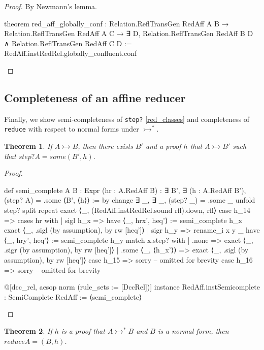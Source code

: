 \documentclass{article}
\newtheorem{theorem}{Theorem}
\newcommand{\affarr}{\rightarrowtail}
\begin{document}
\begin{proof}
  By Newmann's lemma.

\begin{leancode}
theorem red_aff_globally_conf : Relation.ReflTransGen RedAff A B
  → Relation.ReflTransGen RedAff A C
  → ∃ D, Relation.ReflTransGen RedAff B D
  ∧ Relation.ReflTransGen RedAff C D :=
  RedAff.instRedRel.globally_confluent.conf
\end{leancode}
\end{proof}

\subsection{Completeness of an affine reducer}

Finally, we show semi-completeness of \texttt{step?} \eqref{red_classes} and completeness of \texttt{reduce} with respect to normal forms under \(\affarr^{*}\).

\begin{theorem}
  If \(A \affarr B\), then there exists \(B'\) and a proof \(h\) that \(A \affarr B'\) such that \(step? A = some (B', h)\).
\end{theorem}

\begin{proof}

\begin{leancode}
def semi_complete {A B : Expr} (hr : A.RedAff B) : ∃ B', ∃ (h : A.RedAff B'), (step? A) = .some ⟨B', ⟨h⟩⟩ := by
  change ∃ _, ∃ _, (step? _) = .some _
  unfold step?
  split
  repeat exact ⟨_, (RedAff.instRedRel.sound rfl).down, rfl⟩
  case h_14 =>
    cases hr with
    | sigl h_x =>
      have ⟨_, hrx', heq'⟩ := semi_complete h_x
      exact ⟨_, .sigl (by assumption), by rw [heq']⟩
    | sigr h_y =>
      rename_i x y _
      have ⟨_, hry', heq'⟩ := semi_complete h_y
      match x.step? with
      | .none =>
        exact ⟨_, .sigr (by assumption), by rw [heq']⟩
      | .some ⟨_, ⟨h_x'⟩⟩ =>
        exact ⟨_, .sigl (by assumption), by rw [heq']⟩
  case h_15 => sorry -- omitted for brevity
  case h_16 => sorry -- omitted for brevity

@[dcc_rel, aesop norm (rule_sets := [DccRel])]
instance RedAff.instSemicomplete : SemiComplete RedAff := ⟨semi_complete⟩
\end{leancode}
\end{proof}

\begin{theorem}
  If \(h\) is a proof that \(A \affarr^{*} B\) and \(B\) is a normal form, then \(reduce A = (B, h)\).
\end{theorem}
\end{document}
